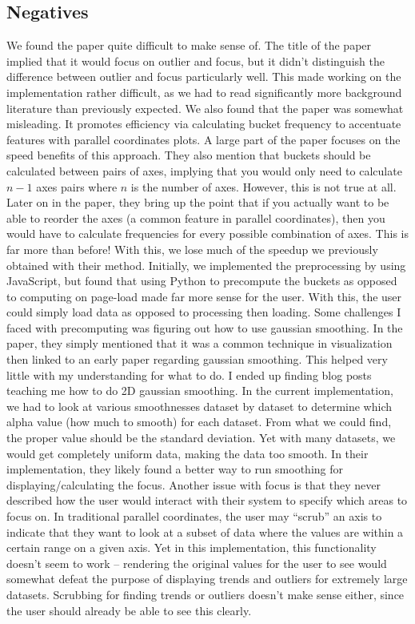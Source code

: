 \documentclass[	DIV=calc,%
			paper=a4,%
			fontsize=11pt,%
			twocolumn]{scrartcl}					%
\begin{document}
\subsection {Negatives}
We found the paper quite difficult to make sense of. The title of the paper implied that it would focus on outlier and focus, but it didn’t distinguish the difference between outlier and focus particularly well. This made working on the implementation rather difficult, as we had to read significantly more background literature than previously expected. 
We also found that the paper was somewhat misleading. It promotes efficiency via calculating bucket frequency to accentuate features with parallel coordinates plots. A large part of the paper focuses on the speed benefits of this approach. They also mention that buckets should be calculated between pairs of axes, implying that you would only need to calculate $n-1$ axes pairs where $n$ is the number of axes. However, this is not true at all. Later on in the paper, they bring up the point that if you actually want to be able to reorder the axes (a common feature in parallel coordinates), then you would have to calculate frequencies for every possible combination of axes. This is far more than before! With this, we lose much of the speedup we previously obtained with their method. 
Initially, we implemented the preprocessing by using JavaScript, but found that using Python to precompute the buckets as opposed to computing on page-load made far more sense for the user. With this, the user could simply load data as opposed to processing then loading. 
Some challenges I faced with precomputing was figuring out how to use gaussian smoothing. In the paper, they simply mentioned that it was a common technique in visualization then linked to an early paper regarding gaussian smoothing. This helped very little with my understanding for what to do. I ended up finding blog posts teaching me how to do 2D gaussian smoothing. In the current implementation, we had to look at various smoothnesses dataset by dataset to determine which alpha value (how much to smooth) for each dataset. From what we could find, the proper value should be the standard deviation. Yet with many datasets, we would get completely uniform data, making the data too smooth. In their implementation, they likely found a better way to run smoothing for displaying/calculating the focus. 
Another issue with focus is that they never described how the user would interact with their system to specify which areas to focus on. In traditional parallel coordinates, the user may “scrub” an axis to indicate that they want to look at a subset of data where the values are within a certain range on a given axis. Yet in this implementation, this functionality doesn’t seem to work -- rendering the original values for the user to see would somewhat defeat the purpose of displaying trends and outliers for extremely large datasets. Scrubbing for finding trends or outliers doesn’t make sense either, since the user should already be able to see this clearly. 
\end{document}
